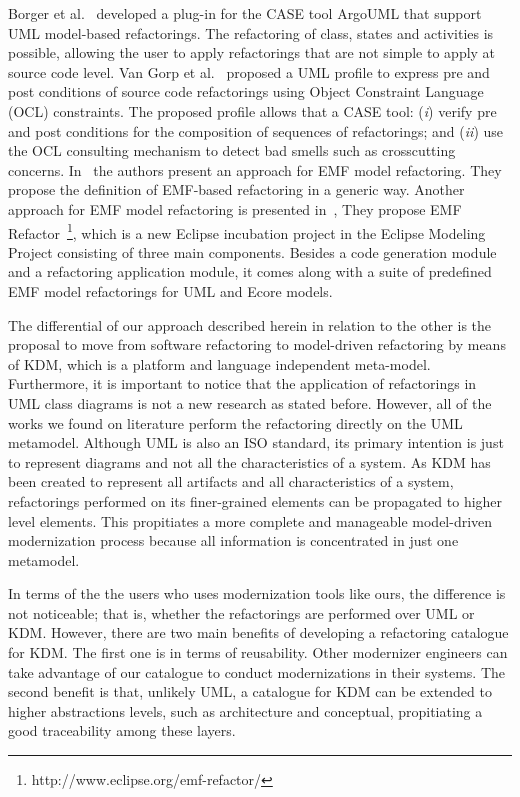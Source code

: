 Borger et al.~\cite{Boger2002} developed a plug-in for the CASE tool ArgoUML that support UML model-based refactorings. The refactoring of class, states and activities is possible, allowing the user to apply refactorings that are not simple to apply at source code level. 
Van Gorp et al.~\cite{Gorp03towardsautomating} proposed a UML profile to express pre and post conditions of source code refactorings using Object Constraint Language (OCL) constraints. The proposed profile allows that a CASE tool: (\textit{i}) verify pre and post conditions for the composition of sequences of refactorings; and (\textit{ii}) use the OCL consulting mechanism to detect bad smells such as crosscutting concerns. In~\cite{Models2010} the authors present an approach for EMF model refactoring. They propose the definition of EMF-based refactoring in a generic way. Another approach for EMF model refactoring is presented in~\cite{ModelsEMFREfactorin}, They propose EMF Refactor~\footnote{http://www.eclipse.org/emf-refactor/}, which is a new Eclipse incubation project in the Eclipse Modeling Project consisting of three main components. Besides a code generation module and a refactoring application module, it comes along with a suite of predefined EMF model refactorings for UML and Ecore models.

The differential of our approach described herein in relation to the other is the proposal to move from software refactoring to model-driven refactoring by means of KDM, which is a platform and language independent meta-model. Furthermore, it is important to notice that the application of refactorings in UML class diagrams is not a new research as stated before. However, all of the works we found on literature perform the refactoring directly on the UML metamodel. Although UML is also an ISO standard, its primary intention is just to represent diagrams and not all the characteristics of a system.  As KDM has been created to represent all artifacts and all characteristics of a system, refactorings performed on its finer-grained elements can be propagated to higher level elements. This propitiates a more complete and manageable model-driven modernization process because all information is concentrated in just one metamodel. 

In terms of the the users who uses modernization tools like ours, the difference is not noticeable; that is, whether the refactorings are performed over UML or KDM. However, there are two main benefits of developing a refactoring catalogue for KDM. The first one is in terms of reusability. Other  modernizer engineers can take advantage of our catalogue to conduct modernizations in their  systems. The second benefit is that, unlikely UML, a catalogue for KDM can be extended to higher abstractions levels, such as architecture and conceptual, propitiating a good traceability among  these layers. 



